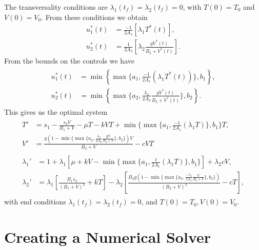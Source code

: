The transversality conditions are $\lambda_1(t_f)=\lambda_2(t_f)=0$, with $T(0)=T_0$ and $V(0)=V_0$. 
From these conditions we obtain
\begin{align*}
	u_1^*(t) &= \frac{-1}{2A_1}\left[\lambda_1T^*(t)\right],\\
	u_2^*(t) &= \frac{1}{2A_2}\left[\lambda_2\frac{gV^*(t)}{B_2+V^*(t)}\right].
\end{align*}
From the bounds on the controls we have
\begin{align*}
	\begin{split}
		u_1^*(t)&=\min\left\{\max\{a_1,\frac{-1}{2A_1}(\lambda_1T^*(t))\},b_1\right\},\\
		u_2^*(t)&=\min\left\{\max\{a_2,\frac{\lambda_2}{2A_2}\frac{gV^*(t)}{B_2+V^*(t)}\},b_2\right\}.
	\end{split}
\end{align*}
This gives us the optimal system
\begin{align}
	\begin{split}
		T'&=s_1-\frac{s_2V}{B_1+V}-\mu T-kVT+\min\{\max\{a_1,\frac{-1}{2A_1}(\lambda_1T)\},b_1\}T,\\
		V'&=\frac{g(1-\min\{\max\{a_2,\frac{\lambda_2}{2A_2}\frac{gV}{B_2+V}\},b_2\})V}{B_2+V}-cVT
	\end{split} \label{modified_state:HIV}\\
	\begin{split}
		\lambda_1'&=1+\lambda_1\left[\mu+kV-\min\{\max\{a_1,\frac{1}{2A_1}(\lambda_1T)\},b_1\}\right]+\lambda_2cV,\\
		\lambda_2'&=\lambda_1\left[\frac{B_1s_2}{(B_1+V)^2}+kT\right]-\lambda_2\left[\frac{B_2g(1-\min\{\max\{a_2,\frac{-\lambda_2}{2A_2}\frac{V}			{B_2+V}\},b_2\})}{(B_2+V)^2}-cT\right],
	\end{split}
\end{align}
with end conditions $\lambda_1(t_f)=\lambda_2(t_f)=0$, and $T(0)=T_0,V(0)=V_0$.

\section*{Creating a Numerical Solver}

